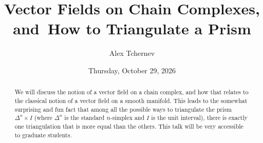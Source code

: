\documentclass{UAmathtalk}
\author{Alex Tchernev}
\title{Vector Fields on Chain Complexes, and~How to Triangulate a Prism}
\date{Thursday, October 29, 2026}
\begin{document}
\maketitle

\begin{abstract}
We will discuss the notion of a vector field on a chain complex, and how that relates to the classical notion of a vector field on a smooth manifold. This leads to the somewhat surprising and fun fact that among all the possible ways to triangulate the prism~$\Delta^n \times I$ (where $\Delta^n$ is the standard $n$-simplex and $I$ is the unit interval), there is exactly one triangulation that is more equal than the others. This talk will be very accessible to graduate students.
\end{abstract}
\end{document}
